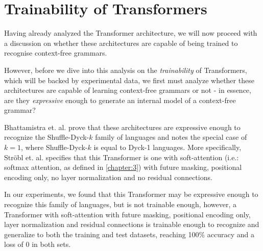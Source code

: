 \chapter{Trainability of Transformers}

Having already analyzed the Transformer architecture, we will now proceed with a discussion on whether these architectures are
capable of being trained to recognise context-free grammars.

However, before we dive into this analysis on the \emph{trainability} of Transformers, which will be backed by experimental data, we
first must analyze whether these architectures are capable of learning context-free grammars or not - in essence,
are they \emph{expressive} enough to generate an internal model of a context-free grammar?

Bhattamistra et. al. \cite{bhattamistra-transformers-formal-langs} prove that these architectures are expressive enough to recognize
the Shuffle-Dyck-$k$ family of languages and notes the special case of $k=1$, where Shuffle-Dyck-$k$ is equal to Dyck-1 languages.
More specifically, Ströbl et. al. \cite{strobl2024formal} specifies that this Transformer is one with soft-attention
(i.e.: softmax attention, as defined in \ref{chapter:3}) with future masking, positional encoding only, no layer normalization and no residual connections.

In our experiments, we found that this Transformer may be expressive enough to recognize this family of languages, but is not
trainable enough, however, a Transformer with soft-attention with future masking, positional encoding only, layer normalization and residual connections
is trainable enough to recognize and generalize to both the training and test datasets, reaching 100\% accuracy and a loss of 0 in both sets.
